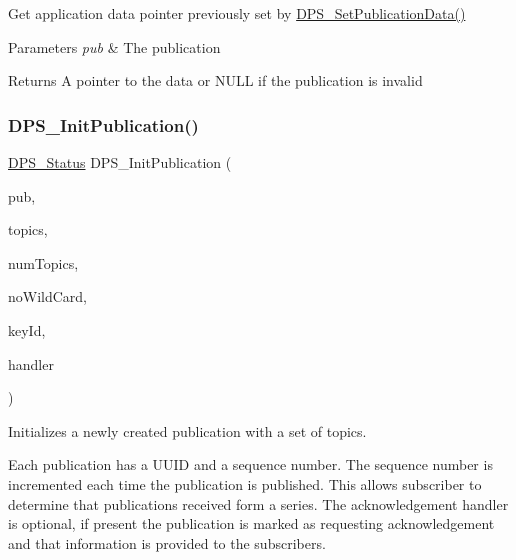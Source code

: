 Get application data pointer previously set by \hyperlink{group__publication_ga91c46ccb6df7f4bb99ca5d9d35cc5a4a}{D\+P\+S\+\_\+\+Set\+Publication\+Data()} 


\begin{DoxyParams}{Parameters}
{\em pub} & The publication\\
\hline
\end{DoxyParams}
\begin{DoxyReturn}{Returns}
A pointer to the data or N\+U\+LL if the publication is invalid 
\end{DoxyReturn}
\mbox{\label{group__publication_ga7b0709e28cb34d5a30b90e4142cd6c19}} 
\subsubsection{\texorpdfstring{D\+P\+S\+\_\+\+Init\+Publication()}{DPS\_InitPublication()}}
{\footnotesize\ttfamily \hyperlink{group__status_ga30395a84d3cad9d4ec29848106415038}{D\+P\+S\+\_\+\+Status} D\+P\+S\+\_\+\+Init\+Publication (\begin{DoxyParamCaption}\item[{\hyperlink{group__publication_ga0d439693474aa54e27f3d45a054696ac}{D\+P\+S\+\_\+\+Publication} $\ast$}]{pub,  }\item[{const char $\ast$$\ast$}]{topics,  }\item[{size\+\_\+t}]{num\+Topics,  }\item[{int}]{no\+Wild\+Card,  }\item[{const \hyperlink{group__keystore_ga4345e29dd2ad5d7fd88a1e988787bd72}{D\+P\+S\+\_\+\+Key\+Id} $\ast$}]{key\+Id,  }\item[{\hyperlink{group__publication_gaf8615f0bcd3d95859cd7f2cdbf772e23}{D\+P\+S\+\_\+\+Acknowledgement\+Handler}}]{handler }\end{DoxyParamCaption})}



Initializes a newly created publication with a set of topics. 

Each publication has a U\+U\+ID and a sequence number. The sequence number is incremented each time the publication is published. This allows subscriber to determine that publications received form a series. The acknowledgement handler is optional, if present the publication is marked as requesting acknowledgement and that information is provided to the subscribers.

